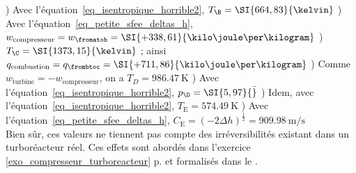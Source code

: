 \begin{description}
						) Avec l’équation~\ref{eq_isentropique_horrible2}, $T_\B = \SI{664,83}{\kelvin}$
						) Avec l’équation~\ref{eq_petite_sfee_deltas_h}, $w_\text{compresseur} = w_\fromatob = \SI{+338,61}{\kilo\joule\per\kilogram}$
						) $T_\C = \SI{1373,15}{\kelvin}$ ; ainsi $q_\text{combustion} = q_\frombtoc = \SI{+711,86}{\kilo\joule\per\kilogram}$
						) Comme $w_\text{turbine} = - w_\text{compresseur}$, on a $T_D = \SI{986,47}{\kelvin}$
						) Avec l’équation~\ref{eq_isentropique_horrible2}, $p_\D = \SI{5,97}{\bar}$
						) Idem, avec l’équation~\ref{eq_isentropique_horrible2}, $T_\text{E} = \SI{574,49}{\kelvin}$
						) Avec l’équation~\ref{eq_petite_sfee_deltas_h}, $C_\text{E} = \left(-2\Delta h\right)^\frac{1}{2} = \SI{909,98}{\metre\per\second}$\\
						\tab Bien sûr, ces valeurs ne tiennent pas compte des irréversibilités existant dans un turboréacteur réel. Ces effets sont abordés dans l’exercice \ref{exo_compresseur_turboreacteur} p.\pageref{exo_compresseur_turboreacteur} et formalisés dans le \coursdix.
\end{description}
